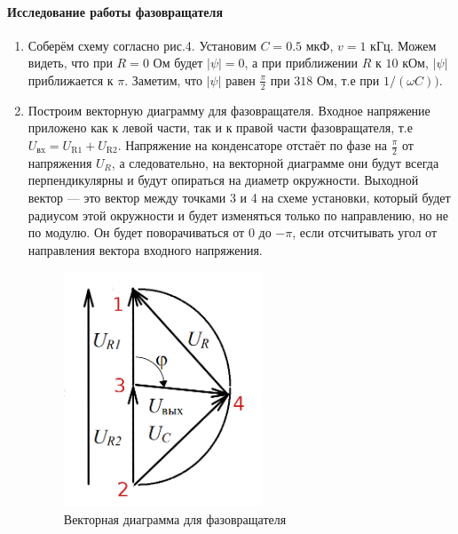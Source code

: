 \documentclass[12pt]{article}
\begin{document}
\paragraph{Исследование работы фазовращателя}
\begin{enumerate}
	\item
		Соберём схему согласно рис.4. Установим $C = 0.5$ мкФ, $v = 1$ кГц. Можем видеть, что при $R = 0$ Ом будет $|\psi| = 0$, а при приближении $R$ к $10$ кОм, $|\psi|$ приближается к $\pi$. Заметим, что $|\psi|$ равен $\frac{\pi}{2}$ при $318$ Ом, т.е при $1 / \left(\omega C\right))$.
	\item
		Построим векторную диаграмму для фазовращателя. Входное напряжение приложено как к левой части, так и к правой части фазовращателя, т.е $U_\text{вx} = U_\text{R1} + U_\text{R2}$. Напряжение на конденсаторе отстаёт по фазе на $\frac{\pi}{2}$ от напряжения $U_R$, а следовательно, на векторной диаграмме они будут всегда перпендикулярны и будут опираться на диаметр окружности. Выходной вектор --- это вектор между точками 3 и 4 на схеме установки, который будет радиусом этой окружности и будет изменяться только по направлению, но не по модулю. Он будет поворачиваться от $0$ до $-\pi$, если отсчитывать угол от направления вектора входного напряжения.
	\begin{figure}[h!]
		\centering
		\includegraphics[height = 7cm]{image5.png}
		\caption{Векторная диаграмма для фазовращателя}
	\end{figure}		 	
\end{enumerate}




					
	
\end{document}
